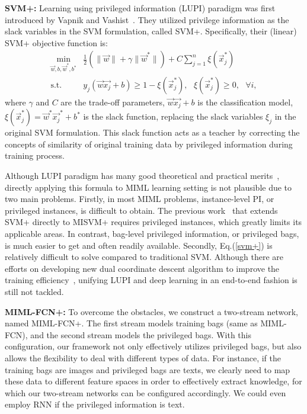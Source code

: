 \documentclass[10pt,twocolumn,letterpaper]{article}
\begin{document}
\textbf{SVM+:} Learning using privileged information (LUPI)
paradigm was first introduced by Vapnik and
Vashist~\cite{Vapnik2009}. They utilized privilege information as
the slack variables in the SVM formulation, called SVM+.
Specifically, their (linear) SVM+ objective function is:
\begin{equation}
\label{svm+}
\begin{matrix}
\underset{\vec{w},b,\vec{w}^*,b^*}{\min} & \frac{1}{2}(\|\vec{w}\|+\gamma\|\vec{w}^*\|) + C\sum_{j=1}^{n}\xi(\vec{x}_j^*) \\
\text{s.t. } & y_j(\vec{w}\vec{x_j}+b) \geq 1 - \xi(\vec{x}_j^*),
\text{ } \xi(\vec{x}_j^*) \geq 0, \text{ } \forall i,
\end{matrix}
\end{equation}
where $\gamma$ and $C$ are the trade-off parameters,
$\vec{w}\vec{x_j}+b$ is the classification model,
$\xi(\vec{x}_j^*) = \vec{w}^{*}\vec{x_j}^*+b^*$ is the slack
function, replacing the slack variables $\xi_j$ in the original
SVM formulation. This slack function acts as a teacher by
correcting the concepts of similarity of original training data by
privileged information during training process.

Although LUPI paradigm has many good theoretical and practical
merits~\cite{Vapnik2009, Vapnik2015a, Vapnik2015b}, directly
applying this formula to MIML learning setting is not plausible
due to two main problems. Firstly, in most MIML problems,
instance-level PI, or privileged instances, is difficult to
obtain. The previous work~\cite{Li2014} that extends SVM+ directly
to MISVM+ requires privileged instances, which greatly limits its
applicable areas. In contrast, bag-level privileged information,
or privileged bags, is much easier to get and often readily
available. Secondly, Eq.(\ref{svm+}) is relatively difficult to
solve compared to traditional SVM. Although there are efforts on
developing new dual coordinate descent algorithm to improve the
training efficiency~\cite{Li2016c}, unifying LUPI and deep
learning in an end-to-end fashion is still not tackled.

\textbf{MIML-FCN+:} To overcome the obstacles, we construct a
two-stream network, named \textsc{MIML-FCN+}. The first stream
models training bags (same as MIML-FCN), and the second stream
models the privileged bags. With this configuration, our framework
not only effectively utilizes privileged bags, but also allows the
flexibility to deal with different types of data. For instance, if
the training bags are images and privileged bags are texts, we
clearly need to map these data to different feature spaces in
order to effectively extract knowledge, for which our two-stream
networks can be configured accordingly. We could even employ RNN
if the privileged information is text.
\end{document}
